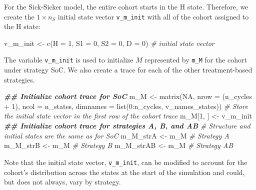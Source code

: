 \documentclass[
]{article}
\newenvironment{Shaded}{\begin{snugshade}}{\end{snugshade}}
\newcommand{\AttributeTok}[1]{\textcolor[rgb]{0.77,0.63,0.00}{#1}}
\newcommand{\CommentTok}[1]{\textcolor[rgb]{0.56,0.35,0.01}{\textit{#1}}}
\newcommand{\ConstantTok}[1]{\textcolor[rgb]{0.00,0.00,0.00}{#1}}
\newcommand{\DecValTok}[1]{\textcolor[rgb]{0.00,0.00,0.81}{#1}}
\newcommand{\DocumentationTok}[1]{\textcolor[rgb]{0.56,0.35,0.01}{\textbf{\textit{#1}}}}
\newcommand{\FunctionTok}[1]{\textcolor[rgb]{0.00,0.00,0.00}{#1}}
\newcommand{\NormalTok}[1]{#1}
\newcommand{\OtherTok}[1]{\textcolor[rgb]{0.56,0.35,0.01}{#1}}
\newcommand{\SpecialCharTok}[1]{\textcolor[rgb]{0.00,0.00,0.00}{#1}}
\begin{document}
For the Sick-Sicker model, the entire cohort starts in the H state. Therefore, we create the \(1 \times n_S\) initial state vector \texttt{v\_m\_init} with all of the cohort assigned to the H state:

\begin{Shaded}
\begin{Highlighting}[]
\NormalTok{v\_m\_init }\OtherTok{\textless{}{-}} \FunctionTok{c}\NormalTok{(}\AttributeTok{H =} \DecValTok{1}\NormalTok{, }\AttributeTok{S1 =} \DecValTok{0}\NormalTok{, }\AttributeTok{S2 =} \DecValTok{0}\NormalTok{, }\AttributeTok{D =} \DecValTok{0}\NormalTok{) }\CommentTok{\# initial state vector}
\end{Highlighting}
\end{Shaded}

The variable \texttt{v\_m\_init} is used to initialize \(M\) represented by \texttt{m\_M} for the cohort under strategy SoC. We also create a trace for each of the other treatment-based strategies.

\begin{Shaded}
\begin{Highlighting}[]
\DocumentationTok{\#\# Initialize cohort trace for SoC}
\NormalTok{m\_M }\OtherTok{\textless{}{-}} \FunctionTok{matrix}\NormalTok{(}\ConstantTok{NA}\NormalTok{, }
              \AttributeTok{nrow =}\NormalTok{ (n\_cycles }\SpecialCharTok{+} \DecValTok{1}\NormalTok{), }\AttributeTok{ncol =}\NormalTok{ n\_states, }
              \AttributeTok{dimnames =} \FunctionTok{list}\NormalTok{(}\DecValTok{0}\SpecialCharTok{:}\NormalTok{n\_cycles, v\_names\_states))}
\CommentTok{\# Store the initial state vector in the first row of the cohort trace}
\NormalTok{m\_M[}\DecValTok{1}\NormalTok{, ] }\OtherTok{\textless{}{-}}\NormalTok{ v\_m\_init}
\DocumentationTok{\#\# Initialize cohort trace for strategies A, B, and AB}
\CommentTok{\# Structure and initial states are the same as for SoC}
\NormalTok{m\_M\_strA  }\OtherTok{\textless{}{-}}\NormalTok{ m\_M }\CommentTok{\# Strategy A}
\NormalTok{m\_M\_strB  }\OtherTok{\textless{}{-}}\NormalTok{ m\_M }\CommentTok{\# Strategy B}
\NormalTok{m\_M\_strAB }\OtherTok{\textless{}{-}}\NormalTok{ m\_M }\CommentTok{\# Strategy AB}
\end{Highlighting}
\end{Shaded}

Note that the initial state vector, \texttt{v\_m\_init}, can be modified to account for the cohort's distribution across the states at the start of the simulation and could, but does not always, vary by strategy.
\end{document}
